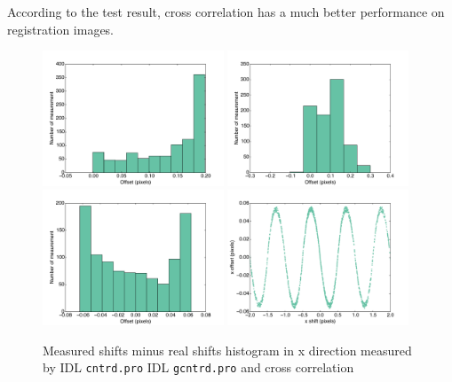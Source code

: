 \documentclass[paper=letter, fontsize=11pt]{scrartcl} %
\numberwithin{equation}{section} %
\numberwithin{figure}{section} %
\numberwithin{table}{section} %
\begin{document}
According to the test result, cross correlation has a much better
performance on registration images.

\begin{figure}
  \centering
  \includegraphics[width=0.48\textwidth]{cntrd_off2}
  \includegraphics[width=0.48\textwidth]{gcntrd_off2}\\
  \includegraphics[width=0.48\textwidth]{crosscorr_off2}
  \includegraphics[width=0.48\textwidth]{crosscorr_cenTes.pdf}\\
  \caption{Measured shifts minus real shifts histogram in x direction
    measured by IDL \texttt{cntrd.pro} IDL \texttt{gcntrd.pro} and
    cross correlation}
  \label{fig:shift1}
\end{figure}
\end{document}
